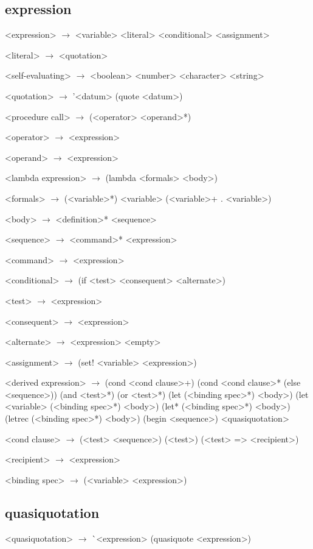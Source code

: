 \documentclass[10pt]{article}
\begin{document}
\subsection*{expression}

\begin{grammar}
  <expression> $\longrightarrow$ <variable>
  \alt <literal>
  \alt <conditional>
  \alt <assignment>

  <literal> $\longrightarrow$ <quotation> 

  <self-evaluating> $\longrightarrow$ <boolean> \alt <number>
  \alt <character> \alt <string>

  <quotation> $\longrightarrow$ '<datum> \alt (quote <datum>)

  <procedure call> $\longrightarrow$ (<operator> <operand>*)
  
  <operator> $\longrightarrow$ <expression>
  
  <operand> $\longrightarrow$ <expression>

  <lambda expression> $\longrightarrow$ (lambda <formals> <body>)

  <formals> $\longrightarrow$ (<variable>*) \alt <variable>
  \alt (<variable>+  .  <variable>)

  <body> $\longrightarrow$ <definition>* <sequence>

  <sequence> $\longrightarrow$ <command>* <expression>

  <command> $\longrightarrow$ <expression>

  <conditional> $\longrightarrow$ (if <test> <consequent> <alternate>)

  <test> $\longrightarrow$ <expression>

  <consequent> $\longrightarrow$ <expression>

  <alternate> $\longrightarrow$ <expression> \alt <empty>

  <assignment> $\longrightarrow$ (set! <variable> <expression>)

  <derived expression> $\longrightarrow$ (cond <cond clause>+)
  \alt (cond <cond clause>* (else <sequence>))
  \alt (and <test>*)
  \alt (or <test>*)
  \alt (let (<binding spec>*) <body>)
  \alt (let <variable> (<binding spec>*) <body>)
  \alt (let* (<binding spec>*) <body>)
  \alt (letrec (<binding spec>*) <body>)
  \alt (begin <sequence>)
  \alt <quasiquotation>

  <cond clause> $\longrightarrow$ (<test> <sequence>)
  \alt (<test>)
  \alt (<test> => <recipient>)

  <recipient> $\longrightarrow$ <expression>

  <binding spec> $\longrightarrow$ (<variable> <expression>)
  
\end{grammar}

\subsection*{quasiquotation}
\begin{grammar}
  <quasiquotation> $\longrightarrow$ \`{}<expression>
  \alt (quasiquote <expression>)
\end{grammar}
\end{document}
